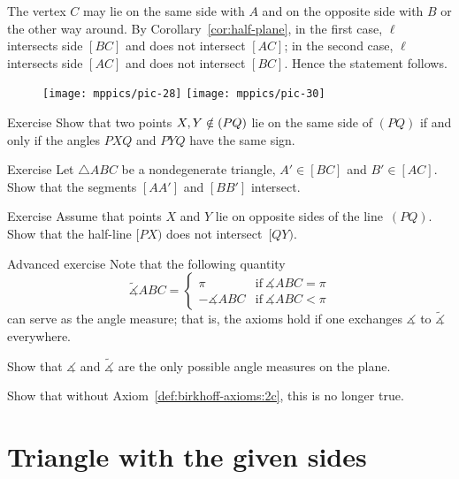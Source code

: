 The vertex $C$ may lie on the same side with $A$ and on the opposite side with $B$ or the other way around.
By Corollary~\ref{cor:half-plane}, in the first case, $\ell$ intersects side $[BC]$ and does not intersect $[AC]$; in the second case, $\ell$ intersects side $[AC]$ and does not intersect $[BC]$.
Hence the statement follows.
\qeds

{

\begin{wrapfigure}[5]{r}{29mm}
\vskip-4mm
\centering
\texttt{[image: mppics/pic-28]}
\bigskip
\texttt{[image: mppics/pic-30]}
\end{wrapfigure}

\begin{thm}{Exercise}\label{ex:signs-PXQ-PYQ}
Show that two points $X,Y\z\notin(PQ)$ lie on the same side of $(PQ)$
if and only if the angles $PXQ$ and $PYQ$ have the same sign.
\end{thm}

\begin{thm}{Exercise}\label{ex:chevinas}
Let $\triangle ABC$ be a nondegenerate triangle,
$A'\in[BC]$  and 
$B'\in [AC]$.
Show that the segments $[AA']$ and $[BB']$ intersect.
\end{thm}

\begin{thm}{Exercise}\label{ex:Z}
Assume that points $X$ and $Y$ lie on opposite sides of the line~$(PQ)$.
Show that the half-line $[PX)$ does not intersect~$[QY)$. 
\end{thm}

}

\begin{thm}{Advanced exercise}\label{ex:angle-measures}
Note that the following quantity 
$$\tilde\measuredangle ABC=
\begin{cases}
\pi&\text{if}\ \measuredangle ABC=\pi
\\
-\measuredangle ABC&\text{if}\ \measuredangle ABC<\pi
\end{cases}
$$
can serve as the angle measure; 
that is, the axioms hold if one exchanges $\measuredangle$ to $\tilde\measuredangle$ everywhere.

Show that $\measuredangle$ and $\tilde\measuredangle$ are the only possible angle measures on the plane. 

Show that without Axiom~\ref{def:birkhoff-axioms:2c}, this is no longer true.
\end{thm}

\section{Triangle with the given sides}

